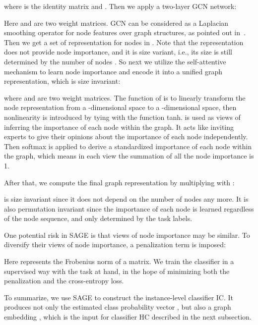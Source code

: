 \documentclass[sigconf]{acmart}
\begin{document}
where  is the identity matrix and .  Then we apply a two-layer GCN network:

Here  and  are two weight matrices.  GCN can be considered as a Laplacian smoothing operator for node features over graph structures, as pointed out in~\cite{DBLP:journals/corr/abs-1801-07606}.  Then we get a set of representation  for nodes in .  Note that the representation  does not provide node importance, and it is size variant, i.e., its size is still determined by the number of nodes .  So next we utilize the self-attentive mechanism to learn node importance and encode it into a unified graph representation, which is size invariant:

where  and  are two weight matrices.  The function of  is to linearly transform the node representation from a -dimensional space to a -dimensional space, then nonlinearity is introduced by tying with the function \textsf{tanh}.  is used as  views of inferring the importance of each node within the graph. It acts like inviting  experts to give their opinions about the importance of each node independently. Then \textsf{softmax} is applied to derive a standardized importance of each node within the graph, which means in each view the summation of all the node importance is 1.

After that, we compute the final graph representation  by multiplying  with :

 is size invariant since it does not depend on the number of nodes  any more.  It is also permutation invariant since the importance of each node is learned regardless of the node sequence, and only determined by the task labels.

One potential risk in SAGE is that  views of node importance may be similar. To diversify their views of node importance, a penalization term is imposed:

Here  represents the Frobenius norm of a matrix.  We train the classifier in a supervised way with the task at hand, in the hope of minimizing both the penalization and the cross-entropy loss.

To summarize, we use SAGE to construct the instance-level classifier IC.  It produces not only the estimated class probability vector , but also a graph embedding , which is the input for classifier HC described in the next subsection.
\end{document}
